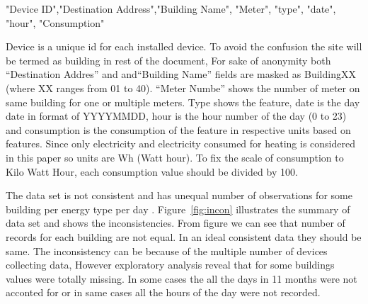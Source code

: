 "Device ID","Destination Address","Building Name", "Meter", "type", "date", "hour", "Consumption"

Device is a unique id for each installed device. To avoid the confusion the site will be termed as building in rest of the document, For sake of anonymity both ``Destination Addres'' and  and``Building Name'' fields are masked as BuildingXX (where XX ranges from  01 to 40). ``Meter Numbe'' shows the number of meter on same building for one or multiple meters. Type shows the feature, date is the day date in format of YYYYMMDD, hour is the hour number of the day (0 to 23) and consumption is the consumption of the feature in respective units based on features. Since only electricity and electricity consumed for heating is considered in this paper so units are Wh (Watt hour).
To fix the scale of consumption to Kilo Watt Hour, each consumption value should be divided by 100. 

The data set is not consistent and has unequal number of observations for some building per energy type per day . Figure~\ref{fig:incon} illustrates the summary of data set and shows the inconsistencies. From figure we can see that number of records for each building are not equal. In an ideal consistent data they should be same. The inconsistency can be because of the multiple number of devices collecting data, However exploratory analysis reveal that for some buildings values were totally missing. In some cases the all the days in 11 months were not acconted for or in same cases all the hours of the day were not recorded.


